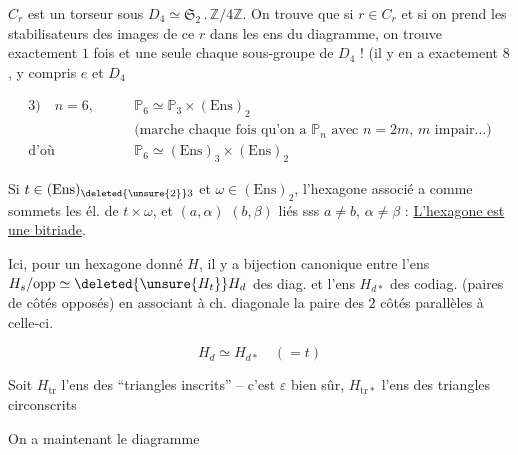 $C_r$ est un torseur sous $D_4\simeq\mathfrak S_2\mathbin{.}\mathbb Z/4\mathbb Z$. On trouve que si $r\in C_r$ et si on prend les stabilisateurs des images de ce $r$ dans les ens du diagramme, on trouve exactement $1$ fois et une seule chaque sous-groupe de $D_4$ ! (il y en a exactement $8$, y compris $e$ et $D_4$


\[
\begin{aligned}
3)\quad n=6,\qquad &\mathbb P_6\simeq\mathbb P_3\times(\mathrm{Ens})_2\\
&\text{(marche chaque fois qu'on a $\mathbb P_n$ avec $n=2m$, $m$ impair\ldots)}\\
\text{d'où}\qquad &\mathbb P_6\simeq(\mathrm{Ens})_3\times(\mathrm{Ens})_2
\end{aligned}
\]

Si $t\in(\mathrm{Ens})_{\deleted{\unsure{2}}3}$ et $\omega\in(\mathrm{Ens})_2$,  l'hexagone associé a comme sommets les él. de $t\times\omega$, et $(a,\alpha)$ $(b,\beta)$  liés sss $a\ne b$, $\alpha\ne\beta$ : \uline{L'hexagone est une bitriade}.

Ici, pour un hexagone donné $H$,  il y a bijection canonique entre l'ens $H_s/\mathrm{opp}\simeq\deleted{\unsure{H_t}}H_d$ des diag. et l'ens $H_{d*}$ des  codiag. (paires de côtés opposés) en associant à ch. diagonale la paire des $2$ côtés parallèles à celle-ci.

\[\boxed{H_d\simeq H_{d*}}\quad(=t)\]

Soit $H_{\mathrm{tr}}$ l'ens des  ``triangles inscrits'' -- c'est $\varepsilon$\deleted{\unsure{\xi}} bien sûr,  $H_{\mathrm{tr}*}$ l'ens des triangles circonscrits

On a maintenant le diagramme



